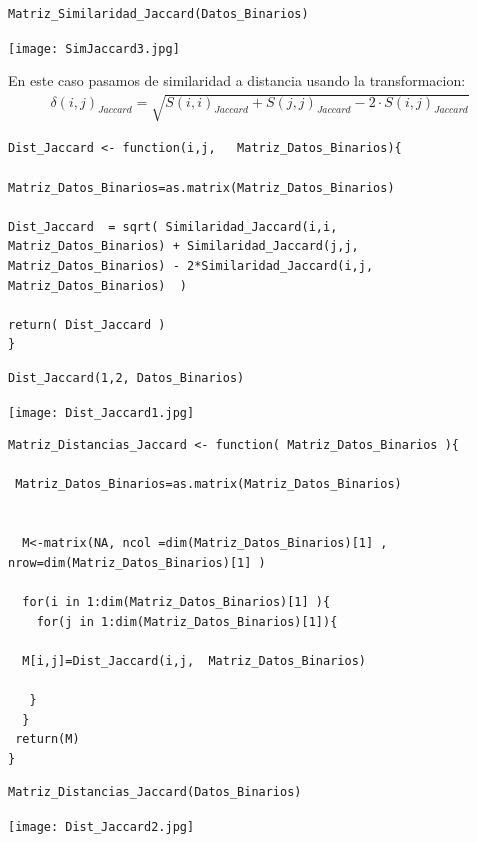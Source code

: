 \documentclass[12pt]{report} %
\begin{document}
\begin{lstlisting}
Matriz_Similaridad_Jaccard(Datos_Binarios)
\end{lstlisting}


\texttt{[image: SimJaccard3.jpg]}

\newpage

En este caso pasamos de similaridad a distancia usando la transformacion: 
\begin{gather*}
 \delta(i,j)_{Jaccard}= \sqrt{ S(i,i)_{Jaccard} + S(j,j)_{Jaccard} - 2\cdot S(i,j)_{Jaccard} }
\end{gather*} 


\begin{lstlisting}
Dist_Jaccard <- function(i,j,   Matriz_Datos_Binarios){

Matriz_Datos_Binarios=as.matrix(Matriz_Datos_Binarios)
  
Dist_Jaccard  = sqrt( Similaridad_Jaccard(i,i,   Matriz_Datos_Binarios) + Similaridad_Jaccard(j,j,   Matriz_Datos_Binarios) - 2*Similaridad_Jaccard(i,j,   Matriz_Datos_Binarios)  )
  
return( Dist_Jaccard )
}
\end{lstlisting}


\begin{lstlisting}
Dist_Jaccard(1,2, Datos_Binarios)
\end{lstlisting}

 \texttt{[image: Dist\_Jaccard1.jpg]}

\begin{lstlisting}
Matriz_Distancias_Jaccard <- function( Matriz_Datos_Binarios ){
  
 Matriz_Datos_Binarios=as.matrix(Matriz_Datos_Binarios)

  
  M<-matrix(NA, ncol =dim(Matriz_Datos_Binarios)[1] , nrow=dim(Matriz_Datos_Binarios)[1] )
  
  for(i in 1:dim(Matriz_Datos_Binarios)[1] ){
    for(j in 1:dim(Matriz_Datos_Binarios)[1]){
    
  M[i,j]=Dist_Jaccard(i,j,  Matriz_Datos_Binarios)
  
   }
  }
 return(M)
}
\end{lstlisting}

\newpage

\begin{lstlisting}
Matriz_Distancias_Jaccard(Datos_Binarios)
\end{lstlisting}

 \texttt{[image: Dist\_Jaccard2.jpg]}
\end{document}
